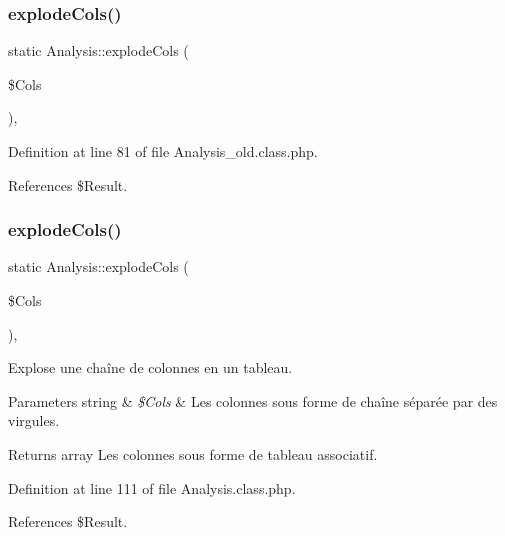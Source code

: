 \subsubsection{\texorpdfstring{explode\+Cols()}{explodeCols()}\hspace{0.1cm}{\footnotesize\ttfamily [1/2]}}
{\footnotesize\ttfamily static Analysis\+::explode\+Cols (\begin{DoxyParamCaption}\item[{}]{\$\+Cols }\end{DoxyParamCaption})\hspace{0.3cm}{\ttfamily [static]}, {\ttfamily [protected]}}



Definition at line 81 of file Analysis\+\_\+old.\+class.\+php.



References \$\+Result.

\mbox{\label{class_analysis_a8ef8111878a5fd011b7702a8d068ca74}} 
\subsubsection{\texorpdfstring{explode\+Cols()}{explodeCols()}\hspace{0.1cm}{\footnotesize\ttfamily [2/2]}}
{\footnotesize\ttfamily static Analysis\+::explode\+Cols (\begin{DoxyParamCaption}\item[{}]{\$\+Cols }\end{DoxyParamCaption})\hspace{0.3cm}{\ttfamily [static]}, {\ttfamily [protected]}}

Explose une chaîne de colonnes en un tableau. 
\begin{DoxyParams}[1]{Parameters}
string & {\em \$\+Cols} & Les colonnes sous forme de chaîne séparée par des virgules. \\
\hline
\end{DoxyParams}
\begin{DoxyReturn}{Returns}
array Les colonnes sous forme de tableau associatif. 
\end{DoxyReturn}


Definition at line 111 of file Analysis.\+class.\+php.



References \$\+Result.

